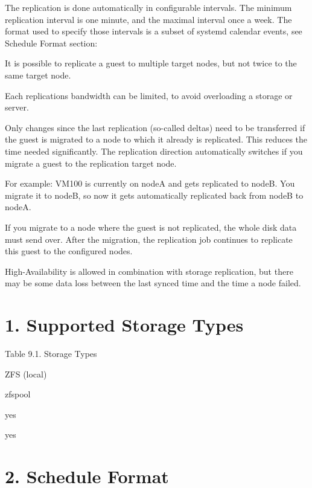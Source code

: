 The replication is done automatically in configurable intervals. The minimum replication interval is one minute, and the maximal interval once a week. The format used to specify those intervals is a subset of systemd calendar events, see Schedule Format section:

It is possible to replicate a guest to multiple target nodes, but not twice to the same target node.

Each replications bandwidth can be limited, to avoid overloading a storage or server.

Only changes since the last replication (so-called deltas) need to be transferred if the guest is migrated to a node to which it already is replicated. This reduces the time needed significantly. The replication direction automatically switches if you migrate a guest to the replication target node.

For example: VM100 is currently on nodeA and gets replicated to nodeB. You migrate it to nodeB, so now it gets automatically replicated back from nodeB to nodeA.

If you migrate to a node where the guest is not replicated, the whole disk data must send over. After the migration, the replication job continues to replicate this guest to the configured nodes.

High-Availability is allowed in combination with storage replication, but there may be some data loss between the last synced time and the time a node failed.


\section{1. Supported Storage Types}

Table 9.1. Storage Types

ZFS (local)

zfspool

yes

yes

\begin{table}[htbp]

\centering

\begin{tabular}

\end{tabular}

\end{table}


\section{2. Schedule Format}

